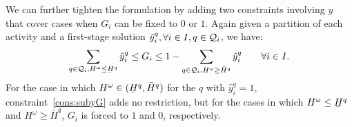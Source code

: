 \documentclass[11pt]{article}
\newcommand{\cQ}{{\cal Q}}
\renewcommand{\underbar}{\underaccent{\bar}}
\newcommand{\tcr}{\textcolor{red}}
\begin{document}
	We can further tighten the formulation by adding two constraints involving \(y\) that cover cases when \(G_i\) can be fixed to \(0\) or \(1\). Again given a partition of each activity and a first-stage solution \(\hat{y}_i^q, \forall i \in I, q \in \cQ_i\), we have:
	\begin{equation}\label{cons:subyG}
	\sum_{q \in \cQ_i, H^\omega {\leq} \underbar{H}^q} \hat{y}_i^q \leq G_i \leq 1 - \sum_{q \in \cQ_i, H^\omega {\geq} \bar{H}^q} \hat{y}_i^q \qquad \forall i \in I.
	\end{equation}
	\tcr{
	}
	{For the case in which \(H^\omega \in (\underbar{H}^q,\bar{H}^q)\) for the $q$ with $\hat{y}_i^q=1$, constraint~\eqref{cons:subyG} adds no restriction, but for the cases in which \(H^\omega \le \underbar{H}^q\) and \(H^\omega \ge \bar{H}^q\), $G_i$ is forced to $1$ and $0$, respectively.}
\end{document}
